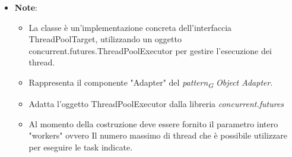 \begin{itemize}
\begin{itemize}
\begin{itemize}
    \end{itemize}
    \item\textbf{Note}:
        \begin{itemize}
            \item La classe è un'implementazione concreta dell'interfaccia ThreadPoolTarget, utilizzando un oggetto concurrent.futures.ThreadPoolExecutor per gestire l'esecuzione dei thread.
            \item Rappresenta il componente "Adapter" del \textit{pattern}\textsubscript{\textit{G}} \textit{Object Adapter}.
            \item Adatta l'oggetto ThreadPoolExecutor dalla libreria \textit{concurrent.futures}
            \item Al momento della costruzione deve essere fornito il parametro intero "workers" ovvero
            Il numero massimo di thread che è possibile utilizzare per eseguire le task indicate.
        \end{itemize}
    \end{itemize}




\end{itemize}


